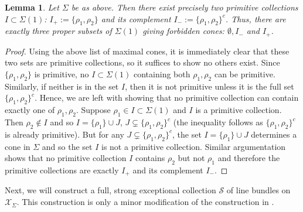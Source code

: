 \documentclass[reqno, 12pt]{amsart}
\newtheorem{lemma}[theorem]{Lemma}
\theoremstyle{definition}
\numberwithin{equation}{section}
\begin{document}
\begin{lemma}
    \label{Lem:AlmSimPrim}
    Let $\Sigma$ be as above. Then there exist precisely two primitive collections $I\subset \Sigma(1)$: $I_+:=\{\rho_1,\rho_2\}$ and its complement $I_-:=\{\rho_1,\rho_2\}^c$. Thus, there are exactly three proper subsets of $\Sigma(1)$ giving forbidden cones: $\emptyset, I_-$ and $ I_+$.
\end{lemma}
\begin{proof}
    Using the above list of maximal cones, it is immediately clear that these two sets are primitive collections, so it suffices to show no others exist. Since $\{\rho_1,\rho_2\}$ is primitive, no $I\subset \Sigma(1)$ containing both $\rho_1,\rho_2$ can be primitive. Similarly, if neither is in the set $I$, then it is not primitive unless it is the full set $\{\rho_1,\rho_2\}^c$. Hence, we are left with showing that no primitive collection can contain exactly one of $\rho_1, \rho_2$. Suppose $\rho_1\in I\subset\Sigma(1)$ and $I$ is a primitive collection. Then $\rho_2\not\in I$ and so $I=\{\rho_1\}\cup J$, $J\subsetneq\{\rho_1,\rho_2\}^c$ (the inequality follows as $\{\rho_1,\rho_2\}^c$ is already primitive). But for any $J\subsetneq \{\rho_1,\rho_2\}^c$, the set $I=\{\rho_1\}\cup J$ determines a cone in $\Sigma$ and so the set $I$ is not a primitive collection. Similar argumentation shows that no primitive collection $I$ contains $\rho_2$ but not $\rho_1$ and therefore the primitive collections are exactly $I_+$ and its complement $I_-$.
\end{proof}

Next, we will construct a full, strong exceptional collection $\mathcal{S}$ of line bundles on $\mathcal{X}_\Sigma$. This construction is only a minor modification of the construction in \cite[\S 5]{BH09}.
\end{document}
